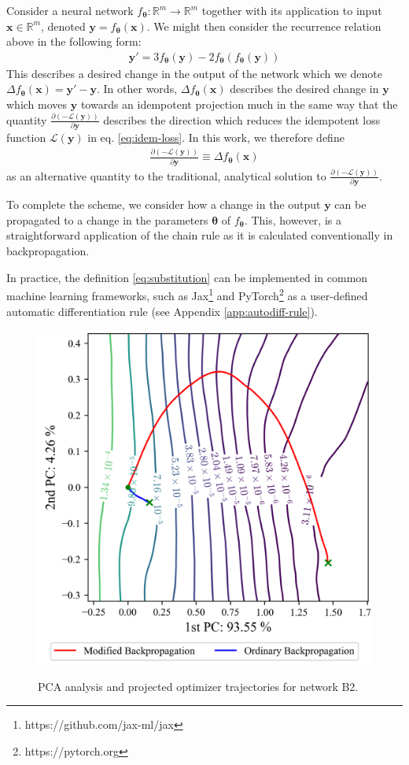 \documentclass{article}
\theoremstyle{plain}
\theoremstyle{definition}
\theoremstyle{remark}
\newcommand{\vx}{\mathbf{x}}
\newcommand{\vy}{\mathbf{y}}
\newcommand{\vtheta}{\bm{\theta}}
\newcommand{\pd}[2]{\frac{\partial{#1}}{\partial{#2}}}
\begin{document}
Consider a neural network $f_{\vtheta}: \mathbb{R}^m \to \mathbb{R}^m$ together with its application to input $\vx \in \mathbb{R}^m$, denoted $\vy = f_{\vtheta}(\vx)$. We might then consider the recurrence relation above in the following form:
%
\begin{align*}
    \vy' = 3f_{\vtheta}(\vy) - 2f_{\vtheta}(f_{\vtheta}(\vy))
\end{align*}
%
This describes a desired change in the output of the network which we denote ${\Delta f_{\vtheta}(\vx) = \vy' - \vy}$. In other words, $\Delta f_{\vtheta}(\vx)$ describes the desired change in $\vy$ which moves $\vy$ towards an idempotent projection much in the same way that the quantity $\pd{(-\mathcal{L}(\vy))}{\vy}$ describes the direction which reduces the idempotent loss function $\mathcal{L}(\vy)$ in eq. \ref{eq:idem-loss}. In this work, we therefore define
%
\begin{align}
    \pd{(-\mathcal{L}(\vy))}{\vy} \equiv \Delta f_{\vtheta}(\vx)
    \label{eq:substitution}
\end{align}
%
as an alternative quantity to the traditional, analytical solution to $\pd{(-\mathcal{L}(\vy))}{\vy}$.

To complete the scheme, we consider how a change in the output $\vy$ can be propagated to a change in the parameters $\vtheta$ of $f_{\vtheta}$. This, however, is a straightforward application of the chain rule as it is calculated conventionally in backpropagation.

In practice, the definition \ref{eq:substitution} can be implemented in common machine learning frameworks, such as Jax\footnote{https://github.com/jax-ml/jax} and PyTorch\footnote{https://pytorch.org} as a user-defined automatic differentiation rule (see Appendix \ref{app:autodiff-rule}).

\begin{figure}[h]
    \centering
    \includegraphics[width=0.95\columnwidth]{./resources/pca_b2.png}
    \label{fig:pca-b2}
    \caption{PCA analysis and projected optimizer trajectories for network B2.}
\end{figure}
\end{document}
